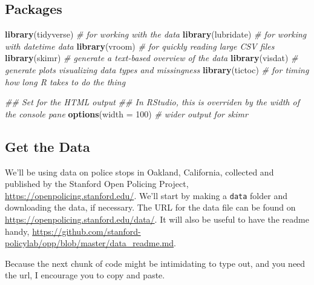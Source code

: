 \documentclass[
]{article}
\newenvironment{Shaded}{\begin{snugshade}}{\end{snugshade}}
\newcommand{\CommentTok}[1]{\textcolor[rgb]{0.56,0.35,0.01}{\textit{#1}}}
\newcommand{\DataTypeTok}[1]{\textcolor[rgb]{0.13,0.29,0.53}{#1}}
\newcommand{\DecValTok}[1]{\textcolor[rgb]{0.00,0.00,0.81}{#1}}
\newcommand{\KeywordTok}[1]{\textcolor[rgb]{0.13,0.29,0.53}{\textbf{#1}}}
\newcommand{\NormalTok}[1]{#1}
\begin{document}
\hypertarget{packages}{%
\subsection{Packages}\label{packages}}

\begin{Shaded}
\begin{Highlighting}[]
\KeywordTok{library}\NormalTok{(tidyverse)   }\CommentTok{\# for working with the data}
\KeywordTok{library}\NormalTok{(lubridate)   }\CommentTok{\# for working with datetime data}
\KeywordTok{library}\NormalTok{(vroom)       }\CommentTok{\# for quickly reading large CSV files}
\KeywordTok{library}\NormalTok{(skimr)       }\CommentTok{\# generate a text{-}based overview of the data}
\KeywordTok{library}\NormalTok{(visdat)      }\CommentTok{\# generate plots visualizing data types and missingness}
\KeywordTok{library}\NormalTok{(tictoc)      }\CommentTok{\# for timing how long R takes to do the thing}

\CommentTok{\#\# Set for the HTML output}
\CommentTok{\#\# In RStudio, this is overriden by the width of the console pane}
\KeywordTok{options}\NormalTok{(}\DataTypeTok{width =} \DecValTok{100}\NormalTok{)  }\CommentTok{\# wider output for skimr}
\end{Highlighting}
\end{Shaded}

\hypertarget{get-the-data}{%
\subsection{Get the Data}\label{get-the-data}}

We'll be using data on police stops in Oakland, California, collected and published by the Stanford Open Policing Project, \url{https://openpolicing.stanford.edu/}. We'll start by making a \texttt{data} folder and downloading the data, if necessary. The URL for the data file can be found on \url{https://openpolicing.stanford.edu/data/}. It will also be useful to have the readme handy, \url{https://github.com/stanford-policylab/opp/blob/master/data_readme.md}.

Because the next chunk of code might be intimidating to type out, and you need the url, I encourage you to copy and paste.
\end{document}

